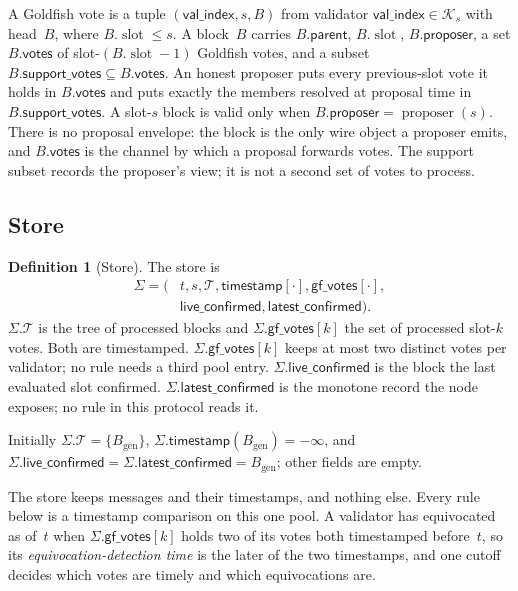 \documentclass{article}
\theoremstyle{plain}
\theoremstyle{definition}
\newtheorem{definition}{Definition}
\theoremstyle{remark}
\newcommand{\genesis}{B_{\mathrm{gen}}}
\newcommand{\slot}{\operatorname{slot}}
\newcommand{\parent}{\mathsf{parent}}
\newcommand{\proposer}{\mathsf{proposer}}
\newcommand{\valindex}{\mathsf{val\_index}}
\newcommand{\committee}{\mathcal K}
\newcommand{\T}{\mathcal T}
\newcommand{\gfPool}{\mathsf{gf\_votes}}
\newcommand{\liveConfirmed}{\mathsf{live\_confirmed}}
\newcommand{\latestConfirmed}{\mathsf{latest\_confirmed}}
\newcommand{\timestamp}{\mathsf{timestamp}}
\begin{document}
A Goldfish vote is a tuple $(\valindex,s,B)$ from validator
$\valindex\in\committee_s$ with
head~$B$, where $B.\slot\leq s$.  A block~$B$ carries $B.\parent$,
$B.\slot$, $B.\proposer$, a set $B.\mathsf{votes}$ of
slot-$(B.\slot-1)$ Goldfish votes, and a subset
$B.\mathsf{support\_votes}\subseteq B.\mathsf{votes}$.
An honest proposer puts every previous-slot vote it holds in
$B.\mathsf{votes}$ and puts exactly the members resolved at proposal time in
$B.\mathsf{support\_votes}$.  A slot-$s$ block is valid only when
$B.\proposer=\operatorname{proposer}(s)$.  There is no proposal envelope:
the block is the only wire object a proposer emits, and $B.\mathsf{votes}$ is
the channel by which a proposal forwards votes.  The support subset records
the proposer's view; it is not a second set of votes to process.

\subsection{Store}\label{sec:goldfish-store}

\begin{definition}[Store]\label{def:store}
The store is
\[
\begin{split}
 \Sigma=(&t,s,\T,\timestamp[\cdot],\gfPool[\cdot],\\
  &\liveConfirmed,\latestConfirmed).
\end{split}
\]
$\Sigma.\T$ is the tree of processed blocks and $\Sigma.\gfPool[k]$ the set
of processed slot-$k$ votes.  Both are timestamped.
$\Sigma.\gfPool[k]$ keeps at most two distinct votes per validator; no rule
needs a third pool entry.  $\Sigma.\liveConfirmed$ is the block the last evaluated
slot confirmed. $\Sigma.\latestConfirmed$ is the
monotone record the node exposes; no rule in this protocol reads it.

Initially $\Sigma.\T=\{\genesis\}$,
$\Sigma.\timestamp(\genesis)=-\infty$, and
$\Sigma.\liveConfirmed=\Sigma.\latestConfirmed=\genesis$; other fields are
empty.
\end{definition}

The store keeps messages and their timestamps, and nothing else. Every rule
below is a timestamp comparison on this one pool.  A validator has equivocated
as of~$t$ when $\Sigma.\gfPool[k]$ holds two of its votes both timestamped
before~$t$, so its \emph{equivocation-detection time} is the later of the
two timestamps, and one cutoff decides which votes are timely and which
equivocations are.
\end{document}

